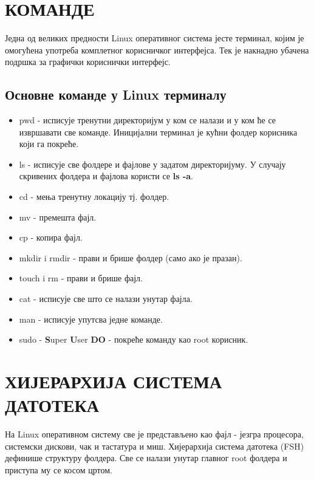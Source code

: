 \documentclass[a4paper,14pt]{article}
\begin{document}
\section{КОМАНДЕ}
Једна од великих предности Linux оперативног система јесте терминал, којим је омогућена употреба комплетног корисничког интерфејса. Тек је накнадно убачена подршка за графички кориснички интерфејс.
\subsection{Основне команде у Linux терминалу}
\begin{itemize}
\item pwd - исписује тренутни директоријум у ком се налази и у ком ће се извршавати све команде. Иницијални терминал је кућни фолдер корисника који га покреће.
\item ls - исписује све фолдере и фајлове у задатом директоријуму. У случају скривених фолдера и фајлова користи се \textbf{ls -a}.
\item cd - мења тренутну локацију тј. фолдер.
\item mv - премешта фајл.
\item cp - копира фајл.
\item mkdir i rmdir - прави и брише фолдер (само ако је празан).
\item touch i rm - прави и брише фајл.
\item cat - исписује све што се налази унутар фајла.
\item man - исписује упутсва једне команде.
\item sudo - \textbf{S}uper \textbf{U}ser \textbf{DO} - покреће команду као root корисник.
\end{itemize}
\newpage

\section{ХИЈЕРАРХИЈА СИСТЕМА ДАТОТЕКА}
На Linux оперативном систему све је представљено као фајл - језгра процесора, системски дискови, чак и тастатура и миш. Хијерархија система датотека (FSH) дефинише структуру фолдера. Све се налази унутар главног root фолдера и приступа му се косом цртом.
\end{document}
